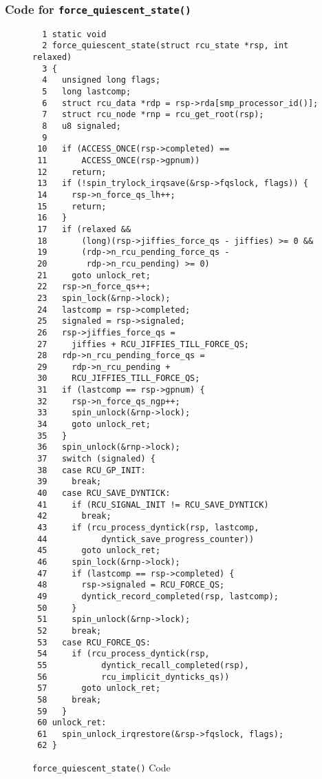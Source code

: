 \subsubsection{Code for {\tt force\_quiescent\_state()}}
\label{app:rcuimpl:rcutreewt:Code for force-quiescent-state}

\begin{figure}[tbp]
{ \scriptsize
\begin{verbatim}
  1 static void
  2 force_quiescent_state(struct rcu_state *rsp, int relaxed)
  3 {
  4   unsigned long flags;
  5   long lastcomp;
  6   struct rcu_data *rdp = rsp->rda[smp_processor_id()];
  7   struct rcu_node *rnp = rcu_get_root(rsp);
  8   u8 signaled;
  9
 10   if (ACCESS_ONCE(rsp->completed) ==
 11       ACCESS_ONCE(rsp->gpnum))
 12     return;
 13   if (!spin_trylock_irqsave(&rsp->fqslock, flags)) {
 14     rsp->n_force_qs_lh++;
 15     return;
 16   }
 17   if (relaxed &&
 18       (long)(rsp->jiffies_force_qs - jiffies) >= 0 &&
 19       (rdp->n_rcu_pending_force_qs -
 20        rdp->n_rcu_pending) >= 0)
 21     goto unlock_ret;
 22   rsp->n_force_qs++;
 23   spin_lock(&rnp->lock);
 24   lastcomp = rsp->completed;
 25   signaled = rsp->signaled;
 26   rsp->jiffies_force_qs =
 27     jiffies + RCU_JIFFIES_TILL_FORCE_QS;
 28   rdp->n_rcu_pending_force_qs =
 29     rdp->n_rcu_pending +
 30     RCU_JIFFIES_TILL_FORCE_QS;
 31   if (lastcomp == rsp->gpnum) {
 32     rsp->n_force_qs_ngp++;
 33     spin_unlock(&rnp->lock);
 34     goto unlock_ret;
 35   }
 36   spin_unlock(&rnp->lock);
 37   switch (signaled) {
 38   case RCU_GP_INIT:
 39     break;
 40   case RCU_SAVE_DYNTICK:
 41     if (RCU_SIGNAL_INIT != RCU_SAVE_DYNTICK)
 42       break;
 43     if (rcu_process_dyntick(rsp, lastcomp,
 44           dyntick_save_progress_counter))
 45       goto unlock_ret;
 46     spin_lock(&rnp->lock);
 47     if (lastcomp == rsp->completed) {
 48       rsp->signaled = RCU_FORCE_QS;
 49       dyntick_record_completed(rsp, lastcomp);
 50     }
 51     spin_unlock(&rnp->lock);
 52     break;
 53   case RCU_FORCE_QS:
 54     if (rcu_process_dyntick(rsp,
 55           dyntick_recall_completed(rsp),
 56           rcu_implicit_dynticks_qs))
 57       goto unlock_ret;
 58     break;
 59   }
 60 unlock_ret:
 61   spin_unlock_irqrestore(&rsp->fqslock, flags);
 62 }
\end{verbatim}
}
\caption{{\tt force\_quiescent\_state()} Code}
\label{fig:app:rcuimpl:rcutreewt:Code for rcutree force-quiescent-state}
\end{figure}


